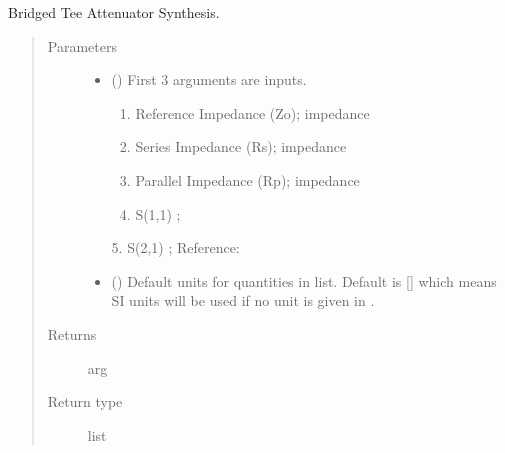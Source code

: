\documentclass[letterpaper,10pt,english]{sphinxmanual}
\begin{document}

\begin{fulllineitems}
\label{\detokenize{components:components.Bridged_Tee_Attenuator_Synthesis}}
Bridged Tee Attenuator Synthesis.
\begin{quote}\begin{description}
\item[{Parameters}] \leavevmode\begin{itemize}
\item {} 
 () \textendash{} 
First 3 arguments are inputs.
\begin{enumerate}
%
\item {} 
Reference Impedance (Zo); impedance

\item {} 
Series Impedance (Rs); impedance

\item {} 
Parallel Impedance (Rp); impedance

\item {} 
S(1,1) ;

\end{enumerate}

5. S(2,1) ;
Reference:


\item {} 
 (\sphinxstyleliteralemphasis{\sphinxupquote{, }}) \textendash{} Default units for quantities in  list. Default is {[}{]} which means SI units will be used if no unit is given in .

\end{itemize}

\item[{Returns}] \leavevmode
arg

\item[{Return type}] \leavevmode
list

\end{description}\end{quote}

\end{fulllineitems}
\end{document}
